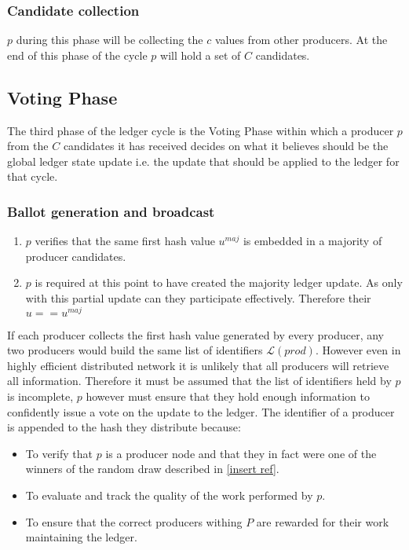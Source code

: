 \documentclass{article}
\begin{document}
\subsubsection{Candidate collection}

$p$ during this phase will be collecting the $c$ values from other producers. At the end of this phase of the cycle $p$ will hold a set of $C$ candidates.



\subsection{Voting Phase}

The third phase of the ledger cycle is the Voting Phase within which a producer $p$ from the $C$ candidates it has received decides on what it believes should be the global ledger state update i.e. the update that should be applied to the ledger for that cycle. 


\subsubsection{Ballot generation and broadcast}

\begin{enumerate}
\item $p$ verifies that the same first hash value $u^{maj}$ is embedded in a majority of producer candidates. 
\item $p$ is required at this point to have created the majority ledger update. As only with this partial update can they participate effectively. Therefore their $u == u^{maj}$

\end{enumerate}
 
If each producer collects the first hash value generated by every producer, any two producers would build the same list of identifiers $\mathcal{L}(prod)$. However even in highly efficient distributed network it is unlikely that all producers will retrieve all information. Therefore it must be assumed that the list of identifiers held by $p$ is incomplete, $p$ however must ensure that they hold enough information to confidently issue a vote on the update to the ledger. The identifier of a producer is appended to the hash they distribute because: 

\begin{itemize}
\item To verify that $p$ is a producer node and that they in fact were one of the winners of the random draw described in \ref{insert ref}. 
\item To evaluate and track the quality of the work performed by $p$.
\item To ensure that the correct producers withing $P$ are rewarded for their work maintaining the ledger. \\

\end{itemize} 
\end{document}
